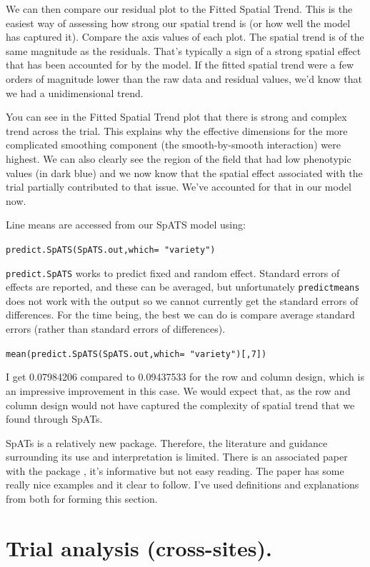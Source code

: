 \documentclass[
]{book}
\begin{document}
We can then compare our residual plot to the Fitted Spatial Trend. This is the easiest way of assessing how strong our spatial trend is (or how well the model has captured it). Compare the axis values of each plot. The spatial trend is of the same magnitude as the residuals. That's typically a sign of a strong spatial effect that has been accounted for by the model. If the fitted spatial trend were a few orders of magnitude lower than the raw data and residual values, we'd know that we had a unidimensional trend.

You can see in the Fitted Spatial Trend plot that there is strong and complex trend across the trial. This explains why the effective dimensions for the more complicated smoothing component (the smooth-by-smooth interaction) were highest. We can also clearly see the region of the field that had low phenotypic values (in dark blue) and we now know that the spatial effect associated with the trial partially contributed to that issue. We've accounted for that in our model now.

Line means are accessed from our SpATS model using:

\texttt{predict.SpATS(SpATS.out,which=\ "variety")}

\texttt{predict.SpATS} works to predict fixed and random effect. Standard errors of effects are reported, and these can be averaged, but unfortunately \texttt{predictmeans} does not work with the output so we cannot currently get the standard errors of differences. For the time being, the best we can do is compare average standard errors (rather than standard errors of differences).

\texttt{mean(predict.SpATS(SpATS.out,which=\ "variety"){[},7{]})}

I get 0.07984206 compared to 0.09437533 for the row and column design, which is an impressive improvement in this case. We would expect that, as the row and column design would not have captured the complexity of spatial trend that we found through SpATs.

SpATs is a relatively new package. Therefore, the literature and guidance surrounding its use and interpretation is limited. There is an associated paper with the package \citep{rodríguezálvarez2016}, it's informative but not easy reading. The paper \citet{velazco_modelling_2017} has some really nice examples and it clear to follow. I've used definitions and explanations from both for forming this section.

\hypertarget{Cross-site-analysis}{%
\chapter{Trial analysis (cross-sites).}\label{Cross-site-analysis}}
\end{document}
